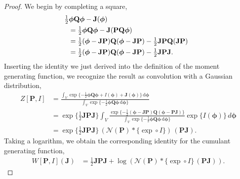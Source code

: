 \documentclass[12pt]{article}
\theoremstyle{definition}
\theoremstyle{plain}
\begin{document}
\begin{proof}
  We begin by completing a square,
  \begin{align}
    &\hskip -6pt \tfrac{1}{2} \boldsymbol{\phi}
    \mathbf{Q} \boldsymbol{\phi}
    - \mathbf{J} (\boldsymbol{\phi}) \\
    &= \tfrac{1}{2} \boldsymbol{\phi}
    \mathbf{Q} \boldsymbol{\phi}
    - \mathbf{J} (\mathbf{P} \mathbf{Q}  \boldsymbol{\phi}) \\
    &= \tfrac{1}{2} (\boldsymbol{\phi} - \mathbf{J}\mathbf{P})
    \mathbf{Q} (\boldsymbol{\phi} - \mathbf{J}\mathbf{P})
    - \tfrac{1}{2}\mathbf{J}\mathbf{P}
    \mathbf{Q} (\mathbf{J}\mathbf{P}) \\
    &= \tfrac{1}{2} (\boldsymbol{\phi} - \mathbf{J}\mathbf{P})
    \mathbf{Q} (\boldsymbol{\phi} - \mathbf{J}\mathbf{P})
    - \tfrac{1}{2}\mathbf{J}\mathbf{P}\mathbf{J} .
  \end{align}
  Inserting the identity we just derived into the definition of the
  moment generating function, we recognize the result as
  convolution with a Gaussian distribution,
  \begin{align}
    Z[\mathbf{P}, I]
    &= \frac{\int_{V} \exp \{-\tfrac{1}{2} \boldsymbol{\phi}
    \mathbf{Q} \boldsymbol{\phi}
    + I (\boldsymbol{\phi}) + \mathbf{J}(\boldsymbol{\phi})\} \,
    \mathrm{d} \boldsymbol{\phi}}
    {\int_{V} \exp \{-\tfrac{1}{2} \boldsymbol{\phi}
    \mathbf{Q} \boldsymbol{\phi}
    \, \mathrm{d} \boldsymbol{\phi}\}} \\
    &= \exp \{\tfrac{1}{2} \mathbf{J}\mathbf{P}\mathbf{J} \}  \int_{V} \frac{\exp \{-\tfrac{1}{2}
    (\boldsymbol{\phi} - \mathbf{J}\mathbf{P})
    \mathbf{Q} (\boldsymbol{\phi} - \mathbf{P}\mathbf{J})\}}{\int_{V} \exp \{-\tfrac{1}{2} \boldsymbol{\phi}
    \mathbf{Q} \boldsymbol{\phi}
    \, \mathrm{d} \boldsymbol{\phi}\}}
    \exp \{I (\boldsymbol{\phi})\} \, d\boldsymbol{\phi} \\
    &= \exp \{\tfrac{1}{2} \mathbf{J}\mathbf{P}\mathbf{J} \} \,
    (\mathcal{N}(\mathbf{P}) * \{\exp \circ I\}) \, (\mathbf{P}\mathbf{J}).
  \end{align}
  Taking a logarithm, we obtain the corresponding identity for the
  cumulant generating function,
  \begin{align}
    W[\mathbf{P}, I](\mathbf{J})
    &= \tfrac{1}{2} \mathbf{J}\mathbf{P}\mathbf{J}  +
    \log (\mathcal{N}(\mathbf{P}) * \{\exp \circ I\}
    \, (\mathbf{P}\mathbf{J})).
  \end{align}
\end{proof} 
\end{document}
